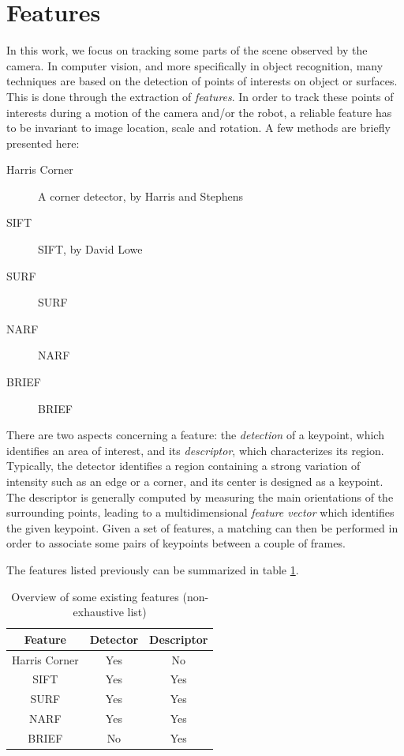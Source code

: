 \section{Features}

In this work, we focus on tracking some parts of the scene observed by the camera. In computer vision, and more specifically in object recognition, many techniques are based on the detection of points of interests on object or surfaces. This is done through the extraction of \emph{features}. In order to track these points of interests during a motion of the camera and/or the robot, a reliable feature has to be invariant to image location, scale and rotation. A few methods are briefly presented here:

\begin{description}
\item[Harris Corner] A corner detector, by Harris and Stephens~\cite{Harris88alvey}
\item[\acrshort{SIFT}]\acrlong{SIFT}, by David Lowe~\cite{lowe_2004_sift} 
\item[\acrshort{SURF}]\acrlong{SURF}~\cite{surf}
\item[\acrshort{NARF}]\acrlong{NARF}~\cite{steder10irosws}
\item[\acrshort{BRIEF}]\acrlong{BRIEF}~\cite{Calonder10-brief}
\end{description}

There are two aspects concerning a feature: the \emph{detection} of a keypoint, which identifies an area of interest, and its \emph{descriptor}, which characterizes its region. Typically, the detector identifies a region containing a strong variation of intensity such as an edge or a corner, and its center is designed as a keypoint. The descriptor is generally computed by measuring the main orientations of the surrounding points, leading to a multidimensional \emph{feature vector} which identifies the given keypoint. Given a set of features, a matching can then be performed in order to associate some pairs of keypoints between a couple of frames.

\clearpage
The features listed previously can be summarized in table \ref{tab:features}.

\begin{table}[H]
 \centering
  \begin{tabular}{c|cc}
  \hline
  Feature & Detector & Descriptor \\
  \hline
  Harris Corner & Yes & No \\
  SIFT & Yes & Yes \\
  SURF & Yes & Yes \\
  NARF & Yes & Yes \\
  BRIEF & No & Yes \\
  \hline
  \end{tabular}
 \caption {Overview of some existing features (non-exhaustive list)}
 \label{tab:features}
\end{table}

